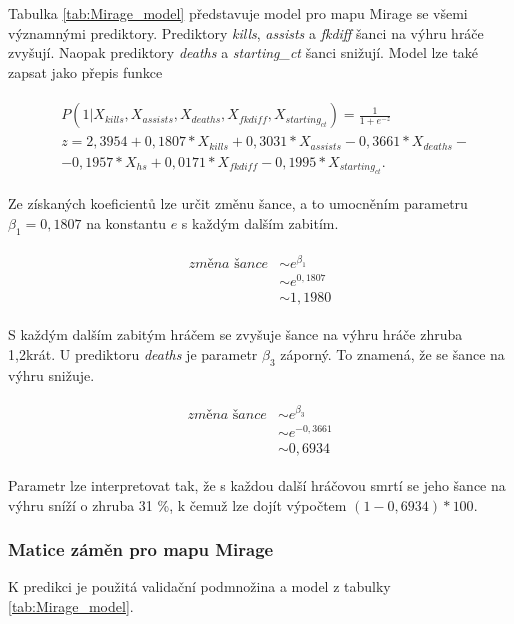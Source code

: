 Tabulka \ref{tab:Mirage_model} představuje model pro mapu Mirage se všemi významnými prediktory. Prediktory \textit{kills}, \textit{assists} a \textit{fkdiff} šanci na výhru
hráče zvyšují. Naopak prediktory \textit{deaths} a \textit{starting\_ct} šanci snižují. Model lze také zapsat jako přepis funkce

\begin{align}
    \begin{split}
        &P(1 | X_{kills}, X_{assists}, X_{deaths}, X_{fkdiff}, X_{starting_{ct}}) = \frac{1}{1 + e^{-z}} \\
        &z = 2,3954 + 0,1807*X_{kills} + 0,3031*X_{assists} - 0,3661*X_{deaths} - \\
        &- 0,1957*X_{hs} + 0,0171*X_{fkdiff} - 0,1995*X_{starting_{ct}}.
    \end{split}
\end{align}

Ze získaných koeficientů lze určit změnu šance, a to umocněním parametru $\beta_1 = 0,1807$ na konstantu $e$ s každým dalším zabitím.

\begin{align}
    \begin{split}
        \textit{změna šance} &\sim e^{\beta_1} \\
                             &\sim e^{0,1807} \\
                             &\sim 1,1980
    \end{split}
\end{align}

S každým dalším zabitým hráčem se zvyšuje šance na výhru hráče zhruba 1,2krát. U prediktoru \textit{deaths} je parametr $\beta_3$ záporný. To znamená, že se šance
na výhru snižuje.

\begin{align}
    \begin{split}
        \textit{změna šance} &\sim e^{\beta_3} \\
                             &\sim e^{-0,3661} \\                     
                             &\sim 0,6934
    \end{split}
\end{align}

Parametr lze interpretovat tak, že s každou další hráčovou smrtí se jeho šance na výhru sníží o zhruba 31 \%, k čemuž lze dojít výpočtem $(1 - 0,6934)*100$. 

\subsubsection{Matice záměn pro mapu Mirage}
K predikci je použitá validační podmnožina a model z tabulky \ref{tab:Mirage_model}.

